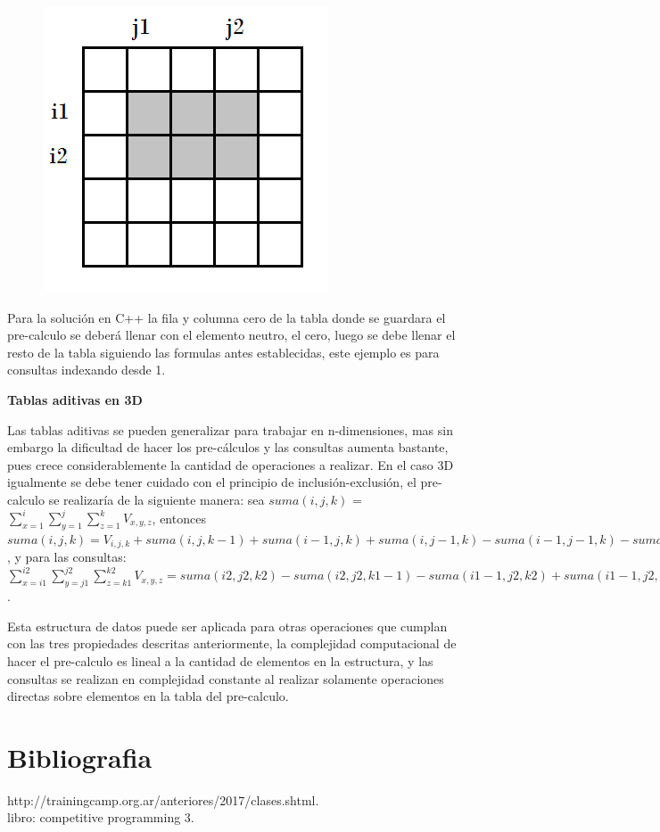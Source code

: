 \documentclass[12pt, a4paper]{article}
\newcommand\cppfile[2][]{

}
\newcommand{\subtitulo}[1]{\begin{center}\textbf{#1}\end{center}}
\begin{document}
\begin{figure}[!htb]
			\caption{}%
		\endminipage
			\centering
			\includegraphics[scale=0.4]{imagenes/img4}
			\caption{}
		\endminipage
	\end{figure}
	
	Para la solución en C++ la fila y columna cero de la tabla donde se guardara el pre-calculo se deberá llenar
	con el elemento neutro, el cero, luego se debe llenar el resto de la tabla siguiendo las formulas antes 
	establecidas, este ejemplo es para consultas indexando desde 1.
	\cppfile[26-36]{codigos/tablas_aditivas.cpp}
	
	\subtitulo{Tablas aditivas en 3D}
	
	Las tablas aditivas se pueden generalizar para trabajar en n-dimensiones, mas sin embargo la dificultad de hacer 
	los pre-cálculos y las consultas aumenta bastante, pues crece considerablemente la cantidad de operaciones a
	realizar. En el caso 3D igualmente se debe tener cuidado con el principio de inclusión-exclusión, el 
	pre-calculo se realizaría de la siguiente manera: sea 
	$suma(i,j,k)$ = $\sum_{x=1}^{i} \sum_{y=1}^{j} \sum_{z=1}^{k} V_{x,y,z}$, entonces  
	$suma(i,j,k) = V_{i,j,k} + suma(i,j,k-1)+suma(i-1,j,k)+suma(i,j-1,k)-suma(i-1,j-1,k)-suma(i-1,j,k-1)
	-suma(i,j-1,k-1)+suma(i-1,j-1,k-1)$, y para las consultas: $\sum_{x=i1}^{i2} \sum_{y=j1}^{j2} \sum_{z=k1}^{k2}
	V_{x,y,z} = suma(i2,j2,k2)-suma(i2,j2,k1-1)-suma(i1-1,j2,k2)+suma(i1-1,j2,k1-1)-suma(i2,j1-1,k2)
	+suma(i2,j1-1,k1-1)+suma(i1-1,j1-1,k2)-suma(i1-1,j1-1,k1-1)$.
	
	Esta estructura de datos puede ser aplicada para otras operaciones que cumplan con las tres propiedades descritas
	anteriormente, la complejidad computacional de hacer el pre-calculo es lineal a la cantidad de
	elementos en la estructura, y las consultas se realizan en complejidad constante al realizar solamente operaciones
	directas sobre elementos en la tabla del pre-calculo.
	
	\section{Bibliografia}
	
	http://trainingcamp.org.ar/anteriores/2017/clases.shtml.\\ 
	libro: competitive programming 3.\\ 
\end{document}

